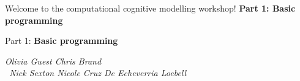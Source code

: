 \documentclass{beamer}
\begin{document}
\begin{frame}
% 
\centering\Huge Welcome to the computational cognitive modelling workshop! 
\vfill \huge
\centering\textbf{Part 1: Basic programming} \normalsize

\vfill
\end{frame}

\begin{frame}
% 
\vfill \Huge
\centering Part 1: \textbf{Basic programming} \large

\vfill
\textit{
Olivia Guest \hfill  Chris Brand 
\vspace{0.5cm} \\ \ 
Nick Sexton \hfill Nicole Cruz De Echeverria Loebell } 
\end{frame}
\end{document}
